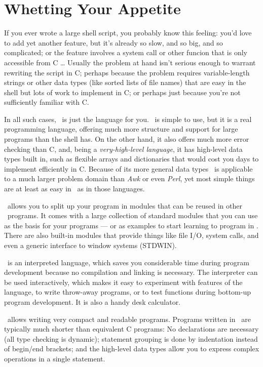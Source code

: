 
\section{Whetting Your Appetite}

If you ever wrote a large shell script, you probably know this feeling:
you'd love to add yet another feature, but it's already so slow, and so
big, and so complicated; or the feature involves a system call or other
funcion that is only accessible from C \ldots
Usually the problem at hand isn't serious enough to warrant rewriting
the script in C; perhaps because the problem requires variable-length
strings or other data types (like sorted lists of file names) that
are easy in the shell but lots of work to implement in C; or perhaps
just because you're not sufficiently familiar with C.

In all such cases, \Python\ is just the language for you.
\Python\ is simple to use, but it is a real programming language, offering
much more structure and support for large programs than the shell has.
On the other hand, it also offers much more error checking than C, and,
being a
{\em very-high-level language},
it has high-level data types built in, such as flexible arrays and
dictionaries that would cost you days to implement efficiently in C.
Because of its more general data types \Python\ is applicable to a
much larger problem domain than
{\em Awk}
or even
{\em Perl},
yet most simple things are at least as easy in \Python\ as in those
languages.

\Python\ allows you to split up your program in modules that can be reused
in other \Python\ programs.
It comes with a large collection of standard modules that you can use as
the basis for your programs --- or as examples to start learning to
program in \Python.
There are also built-in modules that provide things like file I/O,
system calls, and even a generic interface to window systems (STDWIN).

\Python\ is an interpreted language, which saves you considerable time
during program development because no compilation and linking is
necessary.
The interpreter can be used interactively, which makes it easy to
experiment with features of the language, to write throw-away programs,
or to test functions during bottom-up program development.
It is also a handy desk calculator.

\Python\ allows writing very compact and readable programs.
Programs written in \Python\ are typically much shorter than equivalent C
programs:
No declarations are necessary (all type checking is
dynamic); statement grouping is done by indentation instead of begin/end
brackets; and the high-level data types allow you to express complex
operations in a single statement.

